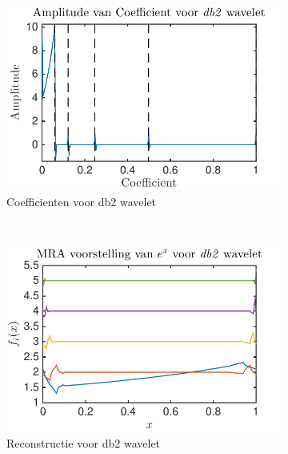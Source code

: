 \begin{figure}
\begin{subfigure}[b]{0.4\textwidth}
        \includegraphics[width=\textwidth]{../src/denoising/db2_noNoise/coef_exp_db2_4}
        \caption{Coefficienten voor db2 wavelet}
        \label{fig:tiger}
    \end{subfigure}
    ~ %
    \begin{subfigure}[b]{0.4\textwidth}
        \includegraphics[width=\textwidth]{../src/denoising/db2_noNoise/MRA_exp_db2_4}
        \caption{Reconstructie voor db2 wavelet}
        \label{fig:mouse}
    \end{subfigure}
    \begin{subfigure}[b]{0.4\textwidth}

\end{subfigure}
\end{figure}
